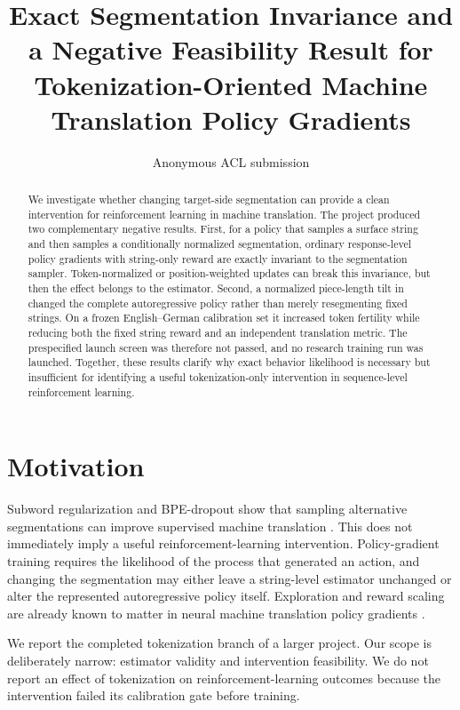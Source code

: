 \documentclass[11pt]{article}
\title{Exact Segmentation Invariance and a Negative Feasibility Result for Tokenization-Oriented Machine Translation Policy Gradients}
\author{Anonymous ACL submission}
\begin{document}
\maketitle

\begin{abstract}
We investigate whether changing target-side segmentation can provide a clean
intervention for reinforcement learning in machine translation.  The project
produced two complementary negative results.  First, for a policy that samples
a surface string and then samples a conditionally normalized segmentation,
ordinary response-level policy gradients with string-only reward are exactly
invariant to the segmentation sampler.  Token-normalized or position-weighted
updates can break this invariance, but then the effect belongs to the estimator.
Second, a normalized piece-length tilt in \ModelName{} changed the complete
autoregressive policy rather than merely resegmenting fixed strings.  On a
frozen English--German calibration set it increased token fertility while
reducing both the fixed string reward and an independent translation metric.
The prespecified launch screen was therefore not passed, and no research
training run was launched.  Together, these results clarify why exact behavior
likelihood is necessary but insufficient for identifying a useful
tokenization-only intervention in sequence-level reinforcement learning.
\end{abstract}

\section{Motivation}

Subword regularization and BPE-dropout show that sampling alternative
segmentations can improve supervised machine translation
\citep{kudo-2018-subword,provilkov-etal-2020-bpe}.  This does not immediately
imply a useful reinforcement-learning intervention.  Policy-gradient training
requires the likelihood of the process that generated an action, and changing
the segmentation may either leave a string-level estimator unchanged or alter
the represented autoregressive policy itself.  Exploration and reward scaling
are already known to matter in neural machine translation policy gradients
\citep{kiegeland-kreutzer-2021-revisiting}.

We report the completed tokenization branch of a larger project.  Our scope is
deliberately narrow: estimator validity and intervention feasibility.  We do
not report an effect of tokenization on reinforcement-learning outcomes because
the intervention failed its calibration gate before training.
\end{document}
